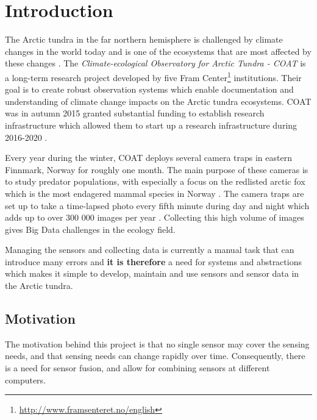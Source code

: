\documentclass[USenglish]{uit-thesis}
\begin{document}
\mainmatter

\chapter{Introduction}
The Arctic tundra in the far northern hemisphere is challenged by climate changes in the world today and is one of the ecosystems that are most affected by these changes \cite{coat2016}. The \textit{Climate-ecological Observatory for Arctic Tundra - COAT} is a long-term research project developed by five Fram Center\footnote{\url{http://www.framsenteret.no/english}} institutions. Their goal is to create robust observation systems which enable documentation and understanding of climate change impacts on the Arctic tundra ecosystems. COAT was in autumn 2015 granted substantial funding to establish research infrastructure which allowed them to start up a research infrastructure during 2016-2020 \cite{coat2016}. 

Every year during the winter, COAT deploys several camera traps in eastern Finnmark, Norway for roughly one month. The main purpose of these cameras is to study predator populations, with especially a focus on the redlisted arctic fox which is the most endagered mammal species in Norway  \cite{coatplan2016}. 
The camera traps are set up to take a time-lapsed photo every fifth minute during day and night which adds up to over 300 000 images per year \cite{methodseco}. Collecting this high volume of images gives Big Data challenges in the ecology field.

Managing the sensors and collecting data is currently a manual task that can introduce many errors and \textbf{it is therefore} a need for systems and abstractions which makes it simple to develop, maintain and use sensors and sensor data in the Arctic tundra. 


\section{Motivation}

The motivation  behind this project is that no single sensor may cover the sensing needs, and that sensing needs can change rapidly over time. Consequently, there is a need for sensor fusion, and allow for combining sensors at different computers.
\end{document}
